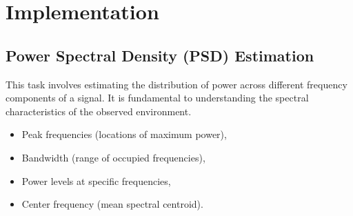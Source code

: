 \documentclass[14pt]{book}
\begin{document}
\section{Implementation}

\subsection{Power Spectral Density (PSD) Estimation}
This task involves estimating the distribution of power across different frequency components of a signal. It is fundamental to understanding the spectral characteristics of the observed environment.
	\begin{itemize}
		\item Peak frequencies (locations of maximum power),
		\item Bandwidth (range of occupied frequencies),
		\item Power levels at specific frequencies,
		\item Center frequency (mean spectral centroid).
	\end{itemize}
	
 
	
	
\end{document}
